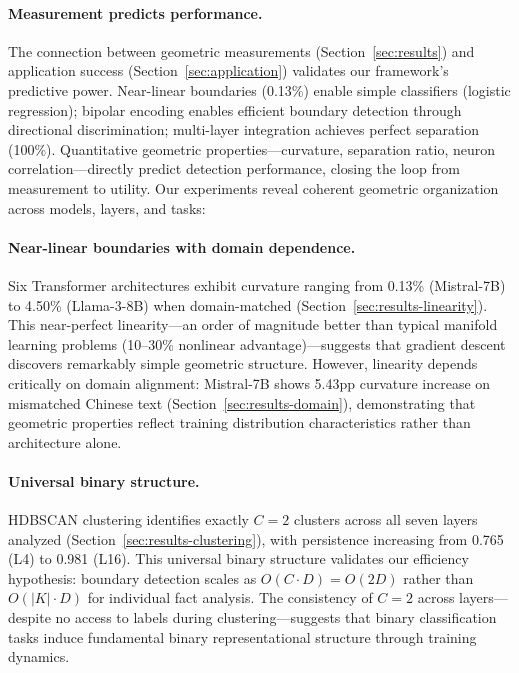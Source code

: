 \documentclass[11pt]{article}
\begin{document}
\paragraph{Measurement predicts performance.} The connection between geometric measurements (Section~\ref{sec:results}) and application success (Section~\ref{sec:application}) validates our framework's predictive power. Near-linear boundaries (0.13\%) enable simple classifiers (logistic regression); bipolar encoding enables efficient boundary detection through directional discrimination; multi-layer integration achieves perfect separation (100\%). Quantitative geometric properties---curvature, separation ratio, neuron correlation---directly predict detection performance, closing the loop from measurement to utility.
Our experiments reveal coherent geometric organization across models, layers, and tasks:

\paragraph{Near-linear boundaries with domain dependence.} Six Transformer architectures exhibit curvature ranging from 0.13\% (Mistral-7B) to 4.50\% (Llama-3-8B) when domain-matched (Section~\ref{sec:results-linearity}). This near-perfect linearity---an order of magnitude better than typical manifold learning problems (10--30\% nonlinear advantage)---suggests that gradient descent discovers remarkably simple geometric structure. However, linearity depends critically on domain alignment: Mistral-7B shows 5.43pp curvature increase on mismatched Chinese text (Section~\ref{sec:results-domain}), demonstrating that geometric properties reflect training distribution characteristics rather than architecture alone.

\paragraph{Universal binary structure.} HDBSCAN clustering identifies exactly $C=2$ clusters across all seven layers analyzed (Section~\ref{sec:results-clustering}), with persistence increasing from 0.765 (L4) to 0.981 (L16). This universal binary structure validates our efficiency hypothesis: boundary detection scales as $O(C \cdot D) = O(2D)$ rather than $O(|K| \cdot D)$ for individual fact analysis. The consistency of $C=2$ across layers---despite no access to labels during clustering---suggests that binary classification tasks induce fundamental binary representational structure through training dynamics.
\end{document}
